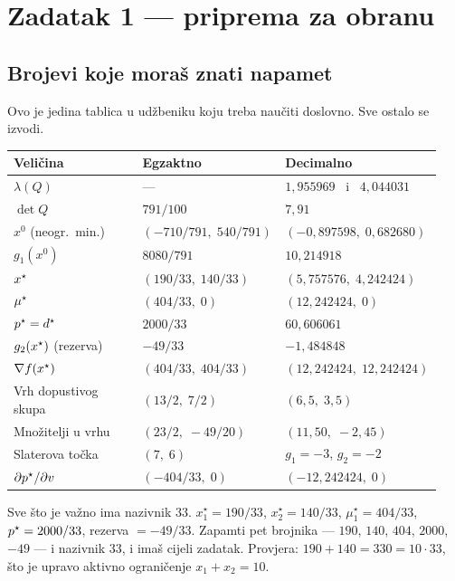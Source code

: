 \chapter{Zadatak 1 --- priprema za obranu}
\label{ch:z1-obrana}

\section{Brojevi koje moraš znati napamet}
\label{sec:z1o-brojevi}

Ovo je jedina tablica u udžbeniku koju treba naučiti doslovno. Sve ostalo se
izvodi.

\begin{longtable}{@{}p{0.30\linewidth} p{0.30\linewidth} p{0.34\linewidth}@{}}
\toprule
\textbf{Veličina} & \textbf{Egzaktno} & \textbf{Decimalno} \\
\midrule
\endhead
$\lambda(Q)$ & --- & $1{,}955969$ \ i \ $4{,}044031$ \\
$\det Q$ & $791/100$ & $7{,}91$ \\
$x^{0}$ (neogr.\ min.) & $(-710/791,\; 540/791)$ & $(-0{,}897598,\; 0{,}682680)$ \\
$g_1(x^{0})$ & $8080/791$ & $10{,}214918$ \\
$x^{\star}$ & $(190/33,\; 140/33)$ & $(5{,}757576,\; 4{,}242424)$ \\
$\mu^{\star}$ & $(404/33,\; 0)$ & $(12{,}242424,\; 0)$ \\
$p^{\star} = d^{\star}$ & $2000/33$ & $60{,}606061$ \\
$g_2(x^{\star})$ (rezerva) & $-49/33$ & $-1{,}484848$ \\
$\nabla f(x^{\star})$ & $(404/33,\; 404/33)$ & $(12{,}242424,\; 12{,}242424)$ \\
Vrh dopustivog skupa & $(13/2,\; 7/2)$ & $(6{,}5,\; 3{,}5)$ \\
Množitelji u vrhu & $(23/2,\; -49/20)$ & $(11{,}50,\; -2{,}45)$ \\
Slaterova točka & $(7,\; 6)$ & $g_1 = -3$, $g_2 = -2$ \\
$\partial p^{\star}/\partial v$ & $(-404/33,\; 0)$ & $(-12{,}242424,\; 0)$ \\
\bottomrule
\end{longtable}

\begin{izgovor}
Sve što je važno ima nazivnik $33$. $x_1^{\star} = 190/33$, $x_2^{\star} = 140/33$,
$\mu_1^{\star} = 404/33$, $p^{\star} = 2000/33$, rezerva $= -49/33$. Zapamti pet
brojnika --- $190$, $140$, $404$, $2000$, $-49$ --- i nazivnik $33$, i imaš cijeli
zadatak. Provjera: $190 + 140 = 330 = 10\cdot33$, što je upravo aktivno
ograničenje $x_1 + x_2 = 10$.
\end{izgovor}

